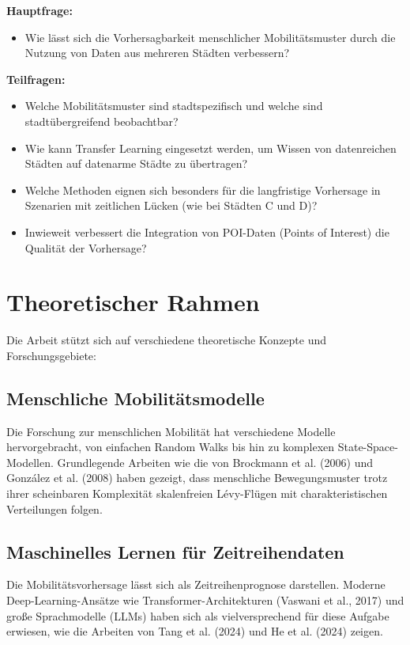 \documentclass[a4paper,12pt]{article}
\begin{document}
\textbf{Hauptfrage:}
\begin{itemize}
    \item Wie lässt sich die Vorhersagbarkeit menschlicher Mobilitätsmuster durch die Nutzung von Daten aus mehreren Städten verbessern?
\end{itemize}

\textbf{Teilfragen:}
\begin{itemize}
    \item Welche Mobilitätsmuster sind stadtspezifisch und welche sind stadtübergreifend beobachtbar?
    \item Wie kann Transfer Learning eingesetzt werden, um Wissen von datenreichen Städten auf datenarme Städte zu übertragen?
    \item Welche Methoden eignen sich besonders für die langfristige Vorhersage in Szenarien mit zeitlichen Lücken (wie bei Städten C und D)?
    \item Inwieweit verbessert die Integration von POI-Daten (Points of Interest) die Qualität der Vorhersage?
\end{itemize}

\section{Theoretischer Rahmen}

Die Arbeit stützt sich auf verschiedene theoretische Konzepte und Forschungsgebiete:

\subsection{Menschliche Mobilitätsmodelle}

Die Forschung zur menschlichen Mobilität hat verschiedene Modelle hervorgebracht, von einfachen Random Walks bis hin zu komplexen State-Space-Modellen. Grundlegende Arbeiten wie die von Brockmann et al. (2006) und González et al. (2008) haben gezeigt, dass menschliche Bewegungsmuster trotz ihrer scheinbaren Komplexität skalenfreien Lévy-Flügen mit charakteristischen Verteilungen folgen.

\subsection{Maschinelles Lernen für Zeitreihendaten}

Die Mobilitätsvorhersage lässt sich als Zeitreihenprognose darstellen. Moderne Deep-Learning-Ansätze wie Transformer-Architekturen (Vaswani et al., 2017) und große Sprachmodelle (LLMs) haben sich als vielversprechend für diese Aufgabe erwiesen, wie die Arbeiten von Tang et al. (2024) und He et al. (2024) zeigen.
\end{document}
